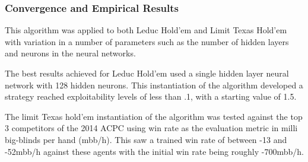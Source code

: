 \subsubsection{Convergence and Empirical Results}
This algorithm was applied to both Leduc Hold'em and Limit Texas Hold'em with variation in a number
of parameters such as the number of hidden layers and neurons in the neural networks.

The best results achieved for Leduc Hold'em used a single hidden layer neural network with 128 hidden neurons.
This instantiation of the algorithm developed a strategy reached exploitability levels of less than .1, with
a starting value of 1.5.

The limit Texas hold'em instantiation of the algorithm was tested against the top 3 competitors of
the 2014 ACPC using win rate as the evaluation metric in milli big-blinds per hand (mbb/h).
This saw a trained win rate of between -13 and -52mbb/h against these agents with the initial win rate being
roughly -700mbb/h.